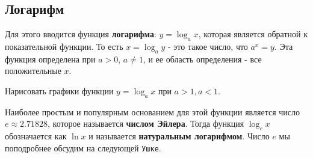 \subsection{Логарифм}
Для этого вводится функция \textbf{логарифма}: $y = \log_a x$, которая является обратной к показательной функции. То есть $x = \log_a y$ - это такое число, что $a^x = y$.
Эта функция определена при $a > 0$, $a \neq 1$, и ее область определения - все положительные $x$. 
\begin{prac}
    Нарисовать графики функции $y = \log_a x$ при $a > 1, a < 1$.
\end{prac}
Наиболее простым и популярным основанием для этой функции является число $e \approx 2.71828$, которое называется \textbf{числом Эйлера}. Тогда функция $\log_e x$ обозначается как $\ln x$ и называется \textbf{натуральным логарифмом}. 
Число $e$ мы поподробнее обсудим на следующей \texttt{Ушке}.
